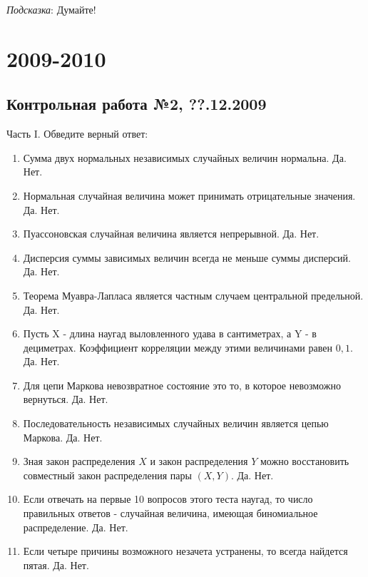 \documentclass[12pt, a4paper]{article}\usepackage[]{graphicx}\usepackage[]{color}
\begin{document}
\emph{Подсказка}: Думайте!



\section{2009-2010}



\subsection{Контрольная работа №2, ??.12.2009}

Часть I. Обведите верный ответ:
\begin{enumerate}
\item Сумма двух нормальных независимых случайных величин нормальна. Да. Нет.

\item Нормальная случайная величина может принимать отрицательные значения. Да. Нет.

\item Пуассоновская случайная величина является непрерывной. Да. Нет.

\item Дисперсия суммы зависимых величин всегда не меньше суммы дисперсий. Да. Нет.

\item Теорема Муавра-Лапласа является частным случаем центральной предельной. Да. Нет.

\item Пусть X - длина наугад выловленного удава в сантиметрах, а Y - в дециметрах. Коэффициент корреляции между этими величинами равен $0,1$. Да. Нет.

\item Для цепи Маркова невозвратное состояние это то, в которое невозможно вернуться. Да. Нет.

\item Последовательность  независимых случайных величин является цепью Маркова. Да. Нет.

\item Зная закон распределения $X$ и закон распределения $Y$ можно восстановить совместный
закон распределения пары $(X,Y)$. Да. Нет.

\item Если отвечать на первые 10 вопросов этого теста наугад, то число правильных ответов - случайная величина, имеющая биномиальное распределение. Да. Нет.

\item Если четыре причины возможного незачета устранены, то всегда найдется пятая. Да. Нет.


\end{enumerate}
\end{document}
